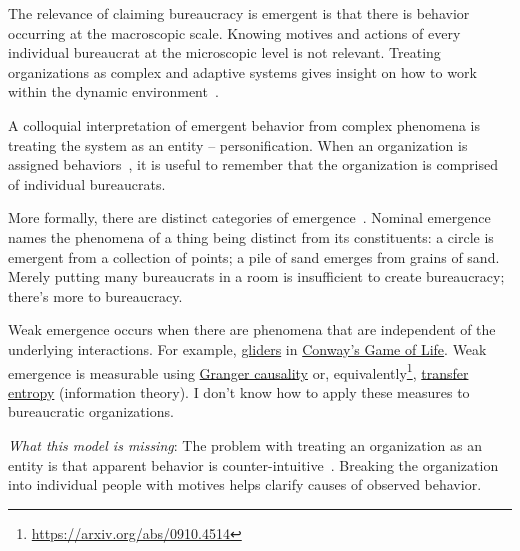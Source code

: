 The relevance of claiming bureaucracy is emergent is that there is behavior occurring at the macroscopic scale. Knowing  motives and actions of every individual bureaucrat at the microscopic level is not relevant. Treating organizations as complex and adaptive systems gives insight on how to work within the dynamic environment~\cite{2011_Eisenhardt}.


A colloquial interpretation of emergent behavior from complex phenomena is treating the system as an entity -- personification.
When an organization is assigned behaviors~\cite{2002_Gall}, it is useful to remember that the organization is comprised of individual bureaucrats. 


More formally, there are distinct categories of emergence~\cite{2002_Bedau, 2021_Carroll_168}. Nominal emergence names the phenomena of a thing being distinct from its constituents: a circle is emergent from a collection of points; a pile of sand emerges from grains of sand. Merely putting many bureaucrats in a room is insufficient to create bureaucracy; there's more to bureaucracy. 

Weak emergence occurs when there are phenomena that are independent of the underlying interactions. For example, \href{https://en.wikipedia.org/wiki/Glider_(Conway\%27s_Life)}{gliders} 
in \href{https://en.wikipedia.org/wiki/Conway\%27s_Game_of_Life}{Conway's Game of Life}.
Weak emergence is measurable using \href{https://en.wikipedia.org/wiki/Granger_causality}{Granger causality} 
or, equivalently\footnote{\href{https://arxiv.org/abs/0910.4514}{https://arxiv.org/abs/0910.4514}}, \href{https://en.wikipedia.org/wiki/Transfer_entropy}{transfer entropy} 
(information theory). I don't know how to apply these measures to bureaucratic organizations. 

\textit{What this model is missing}: The problem with treating an organization as an entity is that apparent behavior is counter-intuitive~\cite{2002_Gall}. Breaking the organization into individual people with motives helps clarify causes of observed behavior. 

